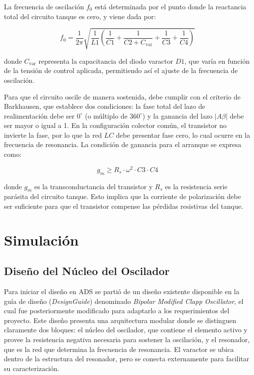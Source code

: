 La frecuencia de oscilación $f_0$ está determinada por el punto donde la reactancia total del circuito tanque es cero, y viene dada por:

\begin{equation}
f_0 = \frac{1}{2\pi} \sqrt{\frac{1}{L1} \left( \frac{1}{C1} + \frac{1}{C2 + C_{\text{var}}} + \frac{1}{C3} + \frac{1}{C4} \right)}
\label{eq:freq_clapp}
\end{equation}

\noindent donde $C_{\text{var}}$ representa la capacitancia del diodo varactor $D1$, que varía en función de la tensión de control aplicada, permitiendo así el ajuste de la frecuencia de oscilación.

Para que el circuito oscile de manera sostenida, debe cumplir con el criterio de Barkhausen, que establece dos condiciones: la fase total del lazo de realimentación debe ser $0^\circ$ (o múltiplo de $360^\circ$) y la ganancia del lazo $|A\beta|$ debe ser mayor o igual a 1. En la configuración colector común, el transistor no invierte la fase, por lo que la red $LC$ debe presentar fase cero, lo cual ocurre en la frecuencia de resonancia. La condición de ganancia para el arranque se expresa como:

\begin{equation}
g_m \geq R_s \cdot \omega^2 \cdot C3 \cdot C4
\label{eq:condicion_arranque}
\end{equation}

\noindent donde $g_m$ es la transconductancia del transistor y $R_s$ es la resistencia serie parásita del circuito tanque. Esto implica que la corriente de polarización debe ser suficiente para que el transistor compense las pérdidas resistivas del tanque.

\section{Simulación}

\subsection{Diseño del Núcleo del Oscilador}

Para iniciar el diseño en ADS se partió de un diseño existente disponible en la guía de diseño (\textit{DesignGuide}) denominado \textit{Bipolar Modified Clapp Oscillator}, el cual fue posteriormente modificado para adaptarlo a los requerimientos del proyecto. Este diseño presenta una arquitectura modular donde se distinguen claramente dos bloques: el núcleo del oscilador, que contiene el elemento activo y provee la resistencia negativa necesaria para sostener la oscilación, y el resonador, que es la red que determina la frecuencia de resonancia. El varactor se ubica dentro de la estructura del resonador, pero se conecta externamente para facilitar su caracterización.

